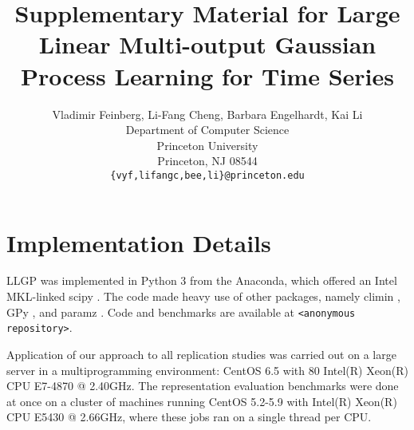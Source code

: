 \documentclass{article}
\title{Supplementary Material for Large Linear Multi-output Gaussian Process Learning for Time Series}
\author{
  Vladimir Feinberg, Li-Fang Cheng, {Barbara Engelhardt}, {Kai Li}\\
  Department of Computer Science\\
  Princeton University\\
  Princeton, NJ 08544 \\
  \texttt{\{vyf,lifangc,bee,li\}@princeton.edu} \\
}
\begin{document}
\maketitle

\section{Implementation Details}

LLGP was implemented in Python 3 from the Anaconda, which offered an Intel MKL-linked scipy \cite{scipy}. The code made heavy use of other packages, namely climin \cite{climin}, GPy \cite{gpy}, and paramz \cite{paramz}. Code and benchmarks are available at \texttt{<anonymous repository>}.

Application of our approach to all replication studies was carried out on a large server in a multiprogramming environment: CentOS 6.5 with 80 Intel(R) Xeon(R) CPU E7-4870 @ 2.40GHz. The representation evaluation benchmarks were done at once on a cluster of machines running CentOS 5.2-5.9 with Intel(R) Xeon(R) CPU E5430 @ 2.66GHz, where these jobs ran on a single thread per CPU.



\end{document}
